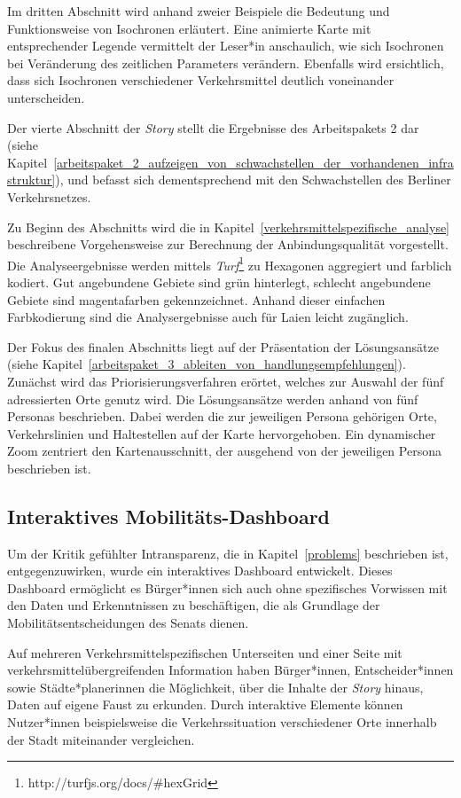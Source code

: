 Im dritten Abschnitt wird anhand zweier Beispiele die Bedeutung und Funktionsweise von Isochronen erläutert. Eine animierte Karte mit entsprechender Legende vermittelt der Leser*in anschaulich, wie sich Isochronen bei Veränderung des zeitlichen Parameters verändern. Ebenfalls wird ersichtlich, dass sich Isochronen verschiedener Verkehrsmittel deutlich voneinander unterscheiden.

Der vierte Abschnitt der \emph{Story} stellt die Ergebnisse des Arbeitspakets 2 dar (siehe Kapitel~\ref{arbeitspaket_2_aufzeigen_von_schwachstellen_der_vorhandenen_infrastruktur}), und befasst sich dementsprechend  mit den Schwachstellen des Berliner Verkehrsnetzes.

Zu Beginn des Abschnitts wird die in Kapitel~\ref{verkehrsmittelspezifische_analyse} beschreibene Vorgehensweise zur Berechnung der Anbindungsqualität vorgestellt. Die Analyseergebnisse werden mittels \emph{Turf}\footnote{http://turfjs.org/docs/\#hexGrid} zu Hexagonen aggregiert und farblich kodiert. Gut angebundene Gebiete sind  grün hinterlegt, schlecht angebundene Gebiete sind magentafarben gekennzeichnet. Anhand dieser einfachen Farbkodierung sind die Analysergebnisse auch für Laien leicht zugänglich.

Der Fokus des finalen Abschnitts liegt auf der Präsentation der Lösungsansätze (siehe Kapitel~\ref{arbeitspaket_3_ableiten_von_handlungsempfehlungen}). Zunächst wird das Priorisierungsverfahren erörtet, welches zur Auswahl der fünf adressierten Orte genutz wird. Die Lösungsansätze werden anhand von fünf Personas beschrieben. Dabei werden die zur jeweiligen Persona gehörigen Orte, Verkehrslinien und Haltestellen auf der Karte hervorgehoben. Ein dynamischer Zoom zentriert den Kartenausschnitt, der ausgehend von der jeweiligen Persona beschrieben ist.

\subsection{Interaktives Mobilitäts-Dashboard}
\label{interaktives_mobilitaets_dashboard}

Um der Kritik gefühlter Intransparenz, die in Kapitel~\ref{problems} beschrieben ist, entgegenzuwirken, wurde ein interaktives Dashboard entwickelt. Dieses Dashboard ermöglicht es Bürger*innen sich auch ohne spezifisches Vorwissen mit den Daten und Erkenntnissen zu beschäftigen, die als Grundlage der Mobilitätsentscheidungen des Senats dienen.

Auf mehreren Verkehrsmittelspezifischen Unterseiten und einer Seite mit verkehrsmittelübergreifenden Information haben Bürger*innen, Entscheider*innen sowie Städte*planerinnen die Möglichkeit, über die Inhalte der \emph{Story} hinaus, Daten auf eigene Faust zu erkunden. Durch interaktive Elemente können Nutzer*innen beispielsweise die Verkehrssituation verschiedener Orte innerhalb der Stadt miteinander vergleichen.

